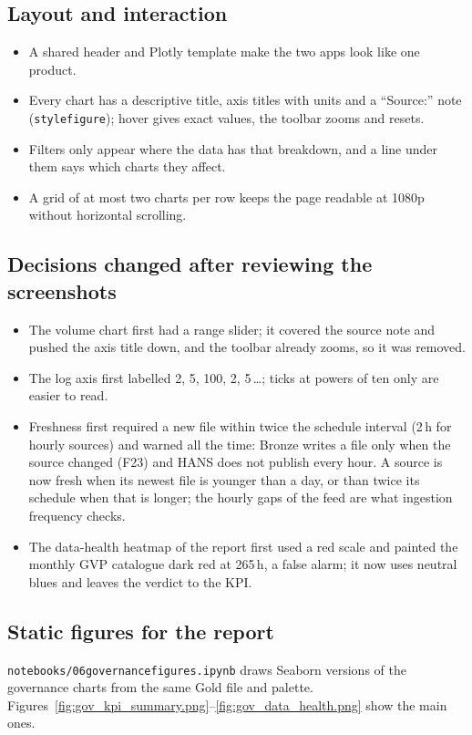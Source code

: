 \documentclass[11pt,a4paper]{article}
\renewcommand{\_}{\textunderscore\allowbreak}
\begin{document}
\subsection{Layout and interaction}
\begin{itemize}
  \item A shared header and Plotly template make the two apps look like one product.
  \item Every chart has a descriptive title, axis titles with units and a ``Source:'' note
        (\texttt{style\_figure}); hover gives exact values, the toolbar zooms and resets.
  \item Filters only appear where the data has that breakdown, and a line under them says which charts
        they affect.
  \item A grid of at most two charts per row keeps the page readable at 1080p without horizontal scrolling.
\end{itemize}

\subsection{Decisions changed after reviewing the screenshots}
\begin{itemize}
  \item The volume chart first had a range slider; it covered the source note and pushed the axis title
        down, and the toolbar already zooms, so it was removed.
  \item The log axis first labelled 2, 5, 100, 2, 5\,\ldots; ticks at powers of ten only are easier to read.
  \item Freshness first required a new file within twice the schedule interval (2\,h for hourly sources)
        and warned all the time: Bronze writes a file only when the source changed (F23) and HANS does not
        publish every hour. A source is now fresh when its newest file is younger than a day, or than twice
        its schedule when that is longer; the hourly gaps of the feed are what ingestion frequency checks.
  \item The data-health heatmap of the report first used a red scale and painted the monthly GVP catalogue
        dark red at 265\,h, a false alarm; it now uses neutral blues and leaves the verdict to the KPI.
\end{itemize}

\subsection{Static figures for the report}
\texttt{notebooks/06\_governance\_figures.ipynb} draws Seaborn versions of the governance charts from the
same Gold file and palette. Figures~\ref{fig:gov_kpi_summary.png}--\ref{fig:gov_data_health.png} show
the main ones.
\end{document}
